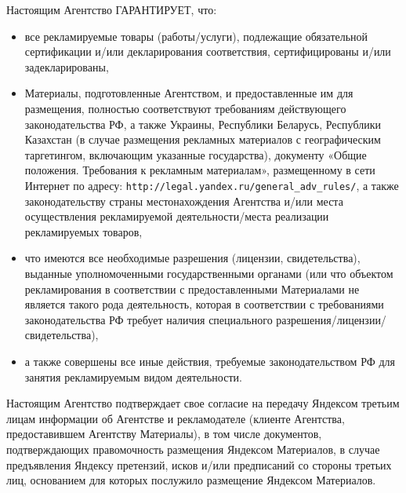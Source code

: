 \noindent
    Настоящим Агентство ГАРАНТИРУЕТ, что:
\begin{itemize}
    \item все рекламируемые товары (работы/услуги), подлежащие обязательной сертификации и/или декларирования соответствия, сертифицированы и/или задекларированы,
    \item Материалы, подготовленные Агентством, и предоставленные им для размещения, полностью соответствуют требованиям действующего законодательства РФ, а также Украины, Республики Беларусь, Республики Казахстан (в случае размещения рекламных материалов с географическим таргетингом, включающим указанные государства), документу «Общие положения. Требования к рекламным материалам», размещенному в сети Интернет по адресу: \lb \verb|http://legal.yandex.ru/general_adv_rules/|, а также законодательству страны местонахождения Агентства и/или места осуществления рекламируемой деятельности/места реализации рекламируемых товаров,
    \item что имеются все необходимые разрешения (лицензии, свидетельства), выданные уполномоченными государственными органами (или что объектом рекламирования в соответствии с предоставленными Материалами не является такого рода деятельность, которая в соответствии с требованиями законодательства РФ требует наличия специального разрешения/лицензии/свидетельства),
    \item а также совершены все иные действия, требуемые законодательством РФ для занятия рекламируемым видом деятельности.
\end{itemize}

\noindent
    Настоящим Агентство подтверждает свое согласие на передачу Яндексом третьим лицам информации об Агентстве и рекламодателе (клиенте Агентства, предоставившем Агентству Материалы), в том числе документов, подтверждающих правомочность  размещения Яндексом Материалов, в случае предъявления Яндексу претензий, исков и/или предписаний со стороны третьих лиц, основанием для которых послужило размещение Яндексом Материалов.
\vspace{0.5em}


